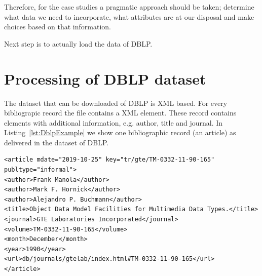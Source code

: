 \documentclass{ou-report}
\newcommand{\dblp}{DBLP}
\begin{document}

Therefore, for the case studies a pragmatic approach should be taken; determine 
what data we need to incorporate, what attributes are at our disposal and make 
choices based on that information.

Next step is to actually load the data of \dblp{}.

\section{Processing of DBLP dataset}
The dataset that can be downloaded of DBLP is XML based. For every bibliograpic 
record the file contains a XML element. These record contains elements with 
additional information, e.g. author, title and journal. In 
Listing~\ref{lst:DblpExample} we show one bibliographic record (an article) as 
delivered in the dataset of DBLP.

\lstset{language=XML}
\begin{lstlisting}[caption={DBLP bibliografic record example},label={lst:DblpExample}]
<article mdate="2019-10-25" key="tr/gte/TM-0332-11-90-165" publtype="informal">
<author>Frank Manola</author>
<author>Mark F. Hornick</author>
<author>Alejandro P. Buchmann</author>
<title>Object Data Model Facilities for Multimedia Data Types.</title>
<journal>GTE Laboratories Incorporated</journal>
<volume>TM-0332-11-90-165</volume>
<month>December</month>
<year>1990</year>
<url>db/journals/gtelab/index.html#TM-0332-11-90-165</url>
</article>
\end{lstlisting}
\end{document}
